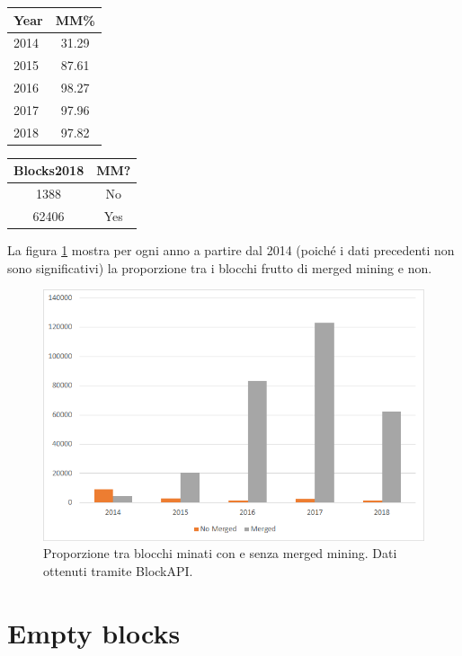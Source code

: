\begin{tabular}{|l|c|}
	\hline 
	\textbf{Year} & \textbf{MM\%} \\ 
	\hline 
	2014 & 31.29 \\ 
	\hline 
	2015 & 87.61 \\ 
	\hline 
	2016 & 98.27 \\ 
	\hline 
	2017 & 97.96 \\ 
	\hline 
	2018 & 97.82 \\ 
	\hline 
\end{tabular}
 
\begin{tabular}{|c|c|}
	\hline 
	\textbf{Blocks2018} & \textbf{MM?} \\ 
	\hline 
	1388 & No \\ 
	\hline
	62406 & Yes \\
	\hline
\end{tabular}


La figura \ref{fig:nomerged-vs-merged} mostra per ogni anno a partire dal 2014 (poiché i dati precedenti non sono significativi) la proporzione tra i blocchi frutto di merged mining e non.

\begin{figure}[h!]
	\centering
	\includegraphics[width=1.0\linewidth]{images/nomerged-vs-merged}
	\caption{Proporzione tra blocchi minati con e senza merged mining. Dati ottenuti tramite BlockAPI.}
	\label{fig:nomerged-vs-merged}
\end{figure}


\section{Empty blocks}
